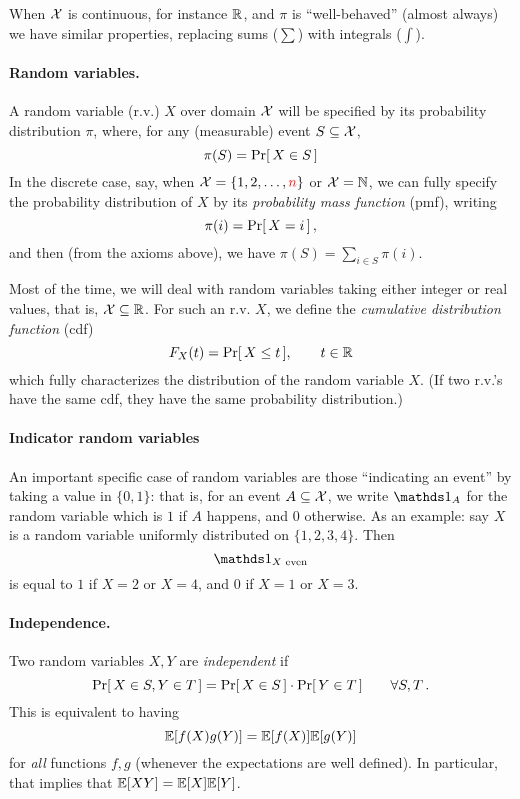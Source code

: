 When $\mathcal{X}$ is continuous, for instance $\mathbb{R}$, and $\pi$ is ``well-behaved'' (almost always) we have similar properties, replacing sums ($\sum$) with integrals ($\int$).

\paragraph{Random variables.} A random variable (r.v.) $X$ over domain $\mathcal{X}$ will be specified by its probability distribution $\pi$, where, for any (measurable) event $S\subseteq \mathcal{X}$,
\[
    \pi(S) = \probaOf{X \in S}
\]
In the discrete case, say, when $\mathcal{X} = \{1,2,\dots, {\textcolor{red}{n}}\}$ or $\mathcal{X} = \mathbb{N}$, we can fully specify the probability distribution of $X$ by its \emph{probability mass function} (pmf), writing
\[
    \pi(i) = \probaOf{X=i}\,,
\]
and then (from the axioms above), we have $\pi(S) = \sum_{i\in S} \pi(i)$.

Most of the time, we will deal with random variables taking either integer or real values, that is, $\mathcal{X}\subseteq \mathbb{R}$. For such an r.v. $X$, we define the \emph{cumulative distribution function} (cdf)
\[
    F_X(t) = \probaOf{X \leq t}, \qquad t\in\R
\]
which fully characterizes the distribution of the random variable $X$. (If two r.v.'s have the same cdf, they have the same probability distribution.)

\paragraph{Indicator random variables} An important specific case of random variables are those ``indicating an event'' by taking a value in $\{0,1\}$: that is, for an event $A\subseteq \mathcal{X}$, we write $\indicSet{A}$ for the random variable which is $1$ if $A$ happens, and $0$ otherwise. As an example: say $X$ is a random variable uniformly distributed on $\{1,2,3,4\}$. Then
\[
    \indicSet{X \text{ even}}
\]
is equal to $1$ if $X=2$ or $X=4$, and $0$ if $X=1$ or $X=3$.

\paragraph{Independence.} Two random variables $X,Y$ are \emph{independent} if
\[
    \probaOf{X \in S, Y\in T} = \probaOf{X\in S}\cdot \probaOf{Y\in T} \qquad \forall S,T\,.
\]
This is equivalent to having
\[
    \expect{f(X)g(Y)} = \expect{f(X)}\expect{g(Y)}
\]
for \emph{all} functions $f,g$ (whenever the expectations are well defined). In particular, that  implies that $\expect{X Y} = \expect{X} \expect{Y}$.

